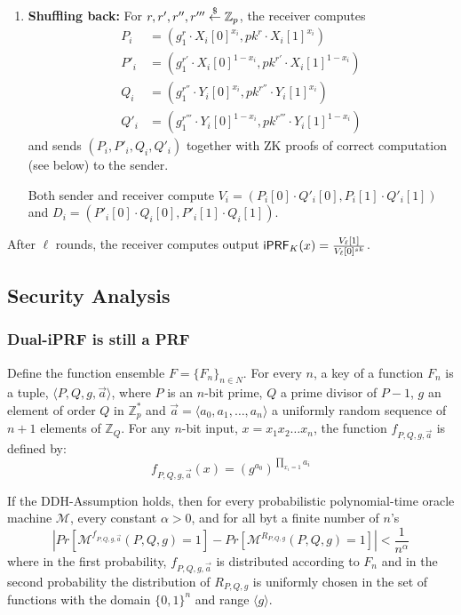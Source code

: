 \begin{enumerate}
\item {\bf Shuffling back:}
  For $r,r',r'',r'''\stackrel{\$}{\leftarrow}\mathbb{Z}_p$, the receiver computes
  \begin{align*}
    P_i&=(g_1^r\cdot{}X_i[0]^{x_i},pk^r\cdot{}X_i[1]^{x_i})
    \\P'_i&=(g_1^{r'}\cdot{}X_i[0]^{1-x_i},pk^{r'}\cdot{}X_i[1]^{1-x_i})
   \\Q_i&=(g_1^{r''}\cdot{}Y_i[0]^{x_i},pk^{r''}\cdot{}Y_i[1]^{x_i})
   \\Q'_i&=(g_1^{r'''}\cdot{}Y_i[0]^{1-x_i},pk^{r'''}\cdot{}Y_i[1]^{1-x_i})
  \end{align*} 
  and sends $(P_i,P'_i,Q_i,Q'_i)$ together with ZK proofs of correct
  computation (see below) to the sender.

  Both sender and receiver compute
  $V_i=(P_i[0]\cdot{}Q'_i[0],P_i[1]\cdot{}Q'_i[1])$ and
  $D_i=(P'_i[0]\cdot{}Q_i[0],P'_i[1]\cdot{}Q_i[1])$.
  
\end{enumerate}

After $\ell$ rounds, the receiver computes output
$\mathsf{i}\mathsf{PRF}_K(x)=\frac{V_\ell[1]}{V_{\ell}[0]^{sk}}$.


\subsection{Security Analysis}
\subsubsection{Dual-iPRF is still a PRF}

\begin{construction} 
Define the function ensemble $F = \{F_n\}_{n\in N}$.  For every $n$, a key of a function $F_n$ is a tuple, $\langle P,Q,g,\vec{a}\rangle$, 
where $P$ is an $n$-bit prime, $Q$ a prime divisor of $P-1$, $g$ an element of order $Q$ in $\mathbb{Z}_{p}^*$ and $\vec{a}=\langle 
a_0,a_1, \ldots , a_n \rangle$ a uniformly random sequence of $n+1$ elements of $\mathbb{Z}_Q$.  For any $n$-bit input, $x=x_1 x_2 \ldots x_n$, the 
function $f_{P,Q,g,\vec{a}}$ is defined by:
 $$f_{P,Q,g,\vec{a}}(x) = (g^{a_0})^{\prod_{x_i=1}a_i}$$
\end{construction}

\begin{theorem}
\label{theorem:naor}
If the DDH-Assumption holds, then for every probabilistic polynomial-time oracle machine $\mathcal{M}$, every constant $\alpha > 0$, and for all byt a finite number of $n$'s
$$| Pr[\mathcal{M}^{f_{P,Q,g,\vec{a}}}(P,Q,g)=1] - Pr[\mathcal{M}^{R_{P,Q,g}}(P,Q,g) = 1]| < \frac{1}{n^\alpha} $$
where in the first probability, $f_{P,Q,g,\vec{a}}$ is distributed according to $F_n$ and in the second probability the distribution of $R_{P,Q,g}$ is uniformly chosen in the set of functions with the domain $\{0,1\}^n$ and range $\langle g\rangle$.
\end{theorem}

